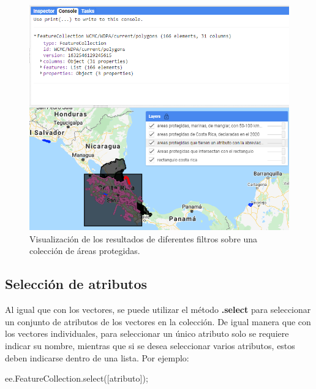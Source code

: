 \documentclass[
  12pt,
  letterpaper,
  twoside]{book}
\newenvironment{Shaded}{\begin{snugshade}}{\end{snugshade}}
\newcommand{\AttributeTok}[1]{\textcolor[rgb]{0.48,0.12,0.64}{#1}}
\newcommand{\FunctionTok}[1]{\textcolor[rgb]{0.48,0.12,0.64}{#1}}
\newcommand{\KeywordTok}[1]{\textcolor[rgb]{0.48,0.12,0.64}{#1}}
\newcommand{\NormalTok}[1]{#1}
\newcommand{\OperatorTok}[1]{\textcolor[rgb]{0.00,0.00,0.00}{#1}}
\newcommand{\StringTok}[1]{\textcolor[rgb]{0.87,0.29,0.22}{#1}}
\newcommand\boldpurple[1]{\textcolor{darkpurple}{\textbf{#1}}}
\begin{document}
\begin{figure}[H]

{\centering \includegraphics[width=0.95\linewidth]{Img/ej18} 

}

\caption{Visualización de los resultados de diferentes filtros sobre una colección de áreas protegidas.}\label{fig:f86}
\end{figure}

\hypertarget{selecciuxf3n-de-atributos}{%
\subsection*{Selección de atributos}\label{selecciuxf3n-de-atributos}}

Al igual que con los vectores, se puede utilizar el método \boldpurple{.select} para seleccionar un conjunto de atributos de los vectores en la colección. De igual manera que con los vectores individuales, para seleccionar un único atributo solo se requiere indicar su nombre, mientras que si se desea seleccionar varios atributos, estos deben indicarse dentro de una lista. Por ejemplo:

\begin{Shaded}
\begin{Highlighting}[]
\KeywordTok{ee}\OperatorTok{.}\AttributeTok{FeatureCollection}\OperatorTok{.}\FunctionTok{select}\NormalTok{([}\StringTok{\textquotesingle{}atributo\textquotesingle{}}\NormalTok{])}\OperatorTok{;}
\end{Highlighting}
\end{Shaded}
\end{document}
